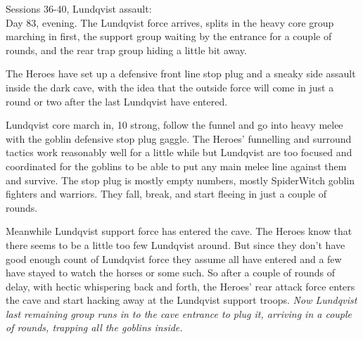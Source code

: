 Sessions 36-40, Lundqvist assault:\\
Day 83, evening. The Lundqvist force arrives, splits in the heavy core group marching in first, the support group waiting by the entrance for a couple of rounds, and the rear trap group hiding a little bit away.

The Heroes have set up a defensive front line stop plug and a sneaky side assault inside the dark cave, with the idea that the outside force will come in just a round or two after the last Lundqvist have entered.

Lundqvist core march in, 10 strong, follow the funnel and go into heavy melee with the goblin defensive stop plug gaggle. The Heroes' funnelling and surround tactics work reasonably well for a little while but Lundqvist are too focused and coordinated for the goblins to be able to put any main melee line against them and survive. The stop plug is mostly empty numbers, mostly SpiderWitch goblin fighters and warriors. They fall, break, and start fleeing in just a couple of rounds.

Meanwhile Lundqvist support force has entered the cave. The Heroes know that there seems to be a little too few Lundqvist around. But since they don't have good enough count of Lundqvist force they assume all have entered and a few have stayed to watch the horses or some such.
So after a couple of rounds of delay, with hectic whispering back and forth, the Heroes' rear attack force enters the cave and start hacking away at the Lundqvist support troops. \textit{Now Lundqvist last remaining group runs in to the cave entrance to plug it, arriving in a couple of rounds, trapping all the goblins inside.}


